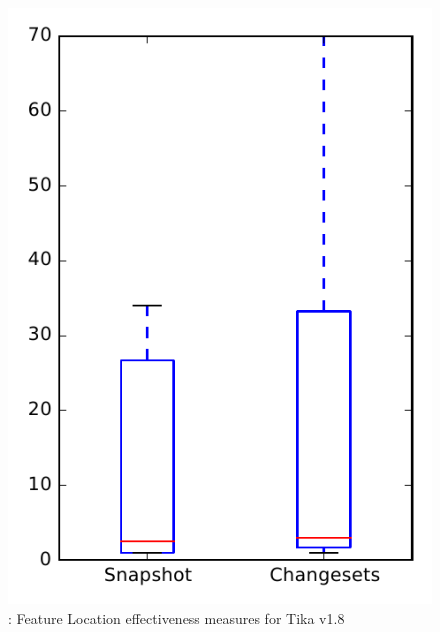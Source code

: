
\begin{figure}
\centering
\includegraphics[height=0.4\textheight]{figures/flt/rq1_tika_no_outlier}
\caption{\fone: Feature Location effectiveness measures for Tika v1.8}
\label{fig:flt:rq1:tika}
\end{figure}
